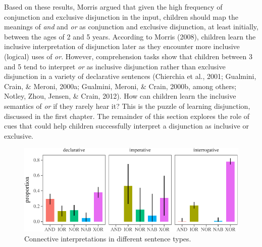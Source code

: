 \documentclass[oneside]{report}
\theoremstyle{definition}
\theoremstyle{definition}
\theoremstyle{definition}
\theoremstyle{remark}
\begin{document}
Based on these results, Morris argued that given the high frequency of
conjunction and exclusive disjunction in the input, children should map
the meanings of \emph{and} and \emph{or} as conjunction and exclusive
disjunction, at least initially, between the ages of 2 and 5 years.
According to Morris (2008), children learn the inclusive interpretation
of disjunction later as they encounter more inclusive (logical) uses of
\emph{or}. However, comprehension tasks show that children between 3 and
5 tend to interpret \emph{or} as inclusive disjunction rather than
exclusive disjunction in a variety of declarative sentences (Chierchia
et al., 2001; Gualmini, Crain, \& Meroni, 2000a; Gualmini, Meroni, \&
Crain, 2000b, among others; Notley, Zhou, Jensen, \& Crain, 2012). How
can children learn the inclusive semantics of \emph{or} if they rarely
hear it? This is the puzzle of learning disjunction, discussed in the
first chapter. The remainder of this section explores the role of cues
that could help children successfully interpret a disjunction as
inclusive or exclusive.
\begin{figure}[tb]

{\centering \includegraphics{figs/utterancetypePlot-1} 

}

\caption{Connective interpretations in different sentence types.}\label{fig:utterancetypePlot}
\end{figure}
\newline
\end{document}
